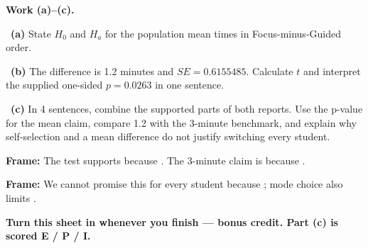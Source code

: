 \documentclass[11pt]{article}
\begin{document}
\newpage
\textbf{Work (a)--(c).}\par\smallskip

~\textbf{(a)} State $H_0$ and $H_a$ for the population mean times in Focus-minus-Guided order.\par
\workspace{0.6in}

~\textbf{(b)} The difference is 1.2 minutes and $SE=0.6155485$. Calculate $t$ and interpret the supplied one-sided $p=0.0263$ in one sentence.\par
\workspace{1.25in}

~\textbf{(c)} In 4 sentences, combine the supported parts of both reports. Use the p-value for the mean claim, compare 1.2 with the 3-minute benchmark, and explain why self-selection and a mean difference do not justify switching every student.\par
\workspace{1.65in}

\begin{sentenceframebox}\raggedright\textbf{Frame:} The test supports \blank[1.8in] because \blank[1.5in]. The 3-minute claim is \blank[1.0in] because \blank[1.6in].\end{sentenceframebox}

\begin{sentenceframebox}\raggedright\textbf{Frame:} We cannot promise this for every student because \blank[2.0in]; mode choice also limits \blank[1.5in].\end{sentenceframebox}

\textbf{Turn this sheet in whenever you finish --- bonus credit. Part (c) is scored E / P / I.}\par
\end{document}

